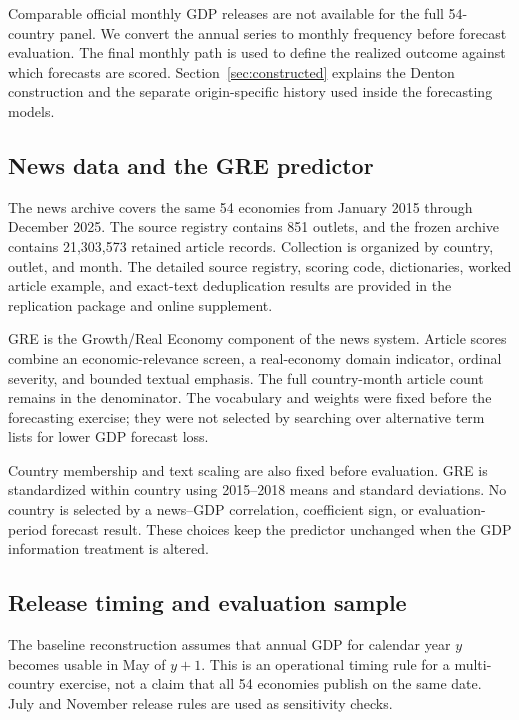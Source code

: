 \documentclass[preprint,12pt,authoryear]{elsarticle}
\begin{document}
Comparable official monthly GDP releases are not available for the full 54-country panel. We convert the annual series to monthly frequency before forecast evaluation. The final monthly path is used to define the realized outcome against which forecasts are scored. Section~\ref{sec:constructed} explains the Denton construction and the separate origin-specific history used inside the forecasting models.

\subsection{News data and the GRE predictor}

The news archive covers the same 54 economies from January 2015 through December 2025. The source registry contains 851 outlets, and the frozen archive contains 21,303,573 retained article records. Collection is organized by country, outlet, and month. The detailed source registry, scoring code, dictionaries, worked article example, and exact-text deduplication results are provided in the replication package and online supplement.

GRE is the Growth/Real Economy component of the news system. Article scores combine an economic-relevance screen, a real-economy domain indicator, ordinal severity, and bounded textual emphasis. The full country-month article count remains in the denominator. The vocabulary and weights were fixed before the forecasting exercise; they were not selected by searching over alternative term lists for lower GDP forecast loss.

Country membership and text scaling are also fixed before evaluation. GRE is standardized within country using 2015--2018 means and standard deviations. No country is selected by a news--GDP correlation, coefficient sign, or evaluation-period forecast result. These choices keep the predictor unchanged when the GDP information treatment is altered.

\subsection{Release timing and evaluation sample}

The baseline reconstruction assumes that annual GDP for calendar year $y$ becomes usable in May of $y+1$. This is an operational timing rule for a multi-country exercise, not a claim that all 54 economies publish on the same date. July and November release rules are used as sensitivity checks.
\end{document}

